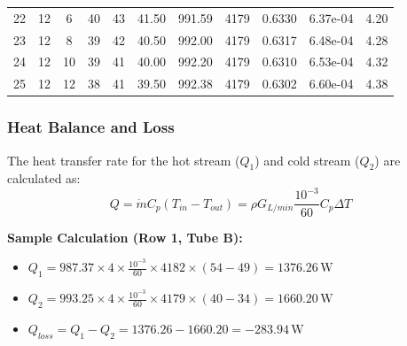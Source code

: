 {\begin{longtable}{|c|c|c|c|c|c|c|c|c|c|c|}
            22           & 12             & 6              & 40                  & 43                   & 41.50                & 991.59            & 4179               & 0.6330               & 6.37e-04         & 4.20            \\
            23           & 12             & 8              & 39                  & 42                   & 40.50                & 992.00            & 4179               & 0.6317               & 6.48e-04         & 4.28            \\
            24           & 12             & 10             & 39                  & 41                   & 40.00                & 992.20            & 4179               & 0.6310               & 6.53e-04         & 4.32            \\
            25           & 12             & 12             & 38                  & 41                   & 39.50                & 992.38            & 4179               & 0.6302               & 6.60e-04         & 4.38            \\ \hline
        \end{longtable}
    }

\subsubsection{Heat Balance and Loss}\label{heat-balance}

The heat transfer rate for the hot stream ($Q_1$) and cold stream ($Q_2$) are calculated as:
\begin{equation}
    Q = \dot{m} C_p (T_{in} - T_{out}) = \rho G_{L/min} \frac{10^{-3}}{60} C_p \Delta T
\end{equation}

\textbf{Sample Calculation (Row 1, Tube B):}
\begin{itemize}
    \item $Q_1 = 987.37 \times 4 \times \frac{10^{-3}}{60} \times 4182 \times (54 - 49) = 1376.26 \, \text{W}$
    \item $Q_2 = 993.25 \times 4 \times \frac{10^{-3}}{60} \times 4179 \times (40 - 34) = 1660.20 \, \text{W}$
    \item $Q_{loss} = Q_1 - Q_2 = 1376.26 - 1660.20 = -283.94 \, \text{W}$
\end{itemize}

